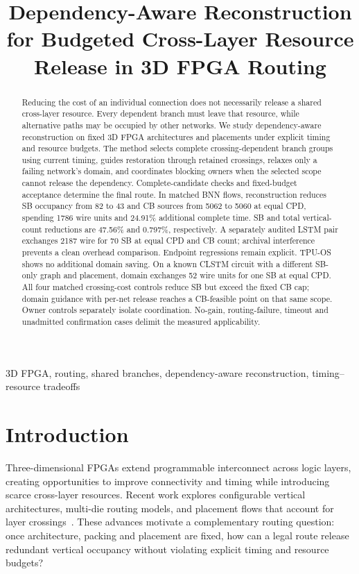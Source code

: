 \documentclass[conference,10pt]{IEEEtran}
\title{Dependency-Aware Reconstruction for Budgeted Cross-Layer Resource Release in 3D FPGA Routing}
\author{\IEEEauthorblockN{Anonymous submission}}
\begin{document}
\maketitle
\begin{abstract}
Reducing the cost of an individual connection does not necessarily release a shared cross-layer resource. Every dependent branch must leave that resource, while alternative paths may be occupied by other networks. We study dependency-aware reconstruction on fixed 3D FPGA architectures and placements under explicit timing and resource budgets. The method selects complete crossing-dependent branch groups using current timing, guides restoration through retained crossings, relaxes only a failing network's domain, and coordinates blocking owners when the selected scope cannot release the dependency. Complete-candidate checks and fixed-budget acceptance determine the final route. In matched BNN flows, reconstruction reduces SB occupancy from 82 to 43 and CB sources from 5062 to 5060 at equal CPD, spending 1786 wire units and 24.91\% additional complete time. SB and total vertical-count reductions are 47.56\% and 0.797\%, respectively. A separately audited LSTM pair exchanges 2187 wire for 70 SB at equal CPD and CB count; archival interference prevents a clean overhead comparison. Endpoint regressions remain explicit. TPU-OS shows no additional domain saving. On a known CLSTM circuit with a different SB-only graph and placement, domain exchanges 52 wire units for one SB at equal CPD. All four matched crossing-cost controls reduce SB but exceed the fixed CB cap; domain guidance with per-net release reaches a CB-feasible point on that same scope. Owner controls separately isolate coordination. No-gain, routing-failure, timeout and unadmitted confirmation cases delimit the measured applicability.
\end{abstract}
\begin{IEEEkeywords}
3D FPGA, routing, shared branches, dependency-aware reconstruction, timing--resource tradeoffs
\end{IEEEkeywords}

\section{Introduction}
Three-dimensional FPGAs extend programmable interconnect across logic layers, creating opportunities to improve connectivity and timing while introducing scarce cross-layer resources. Recent work explores configurable vertical architectures, multi-die routing models, and placement flows that account for layer crossings~\cite{lazagna,multidie,flatland}. These advances motivate a complementary routing question: once architecture, packing and placement are fixed, how can a legal route release redundant vertical occupancy without violating explicit timing and resource budgets?
\end{document}
